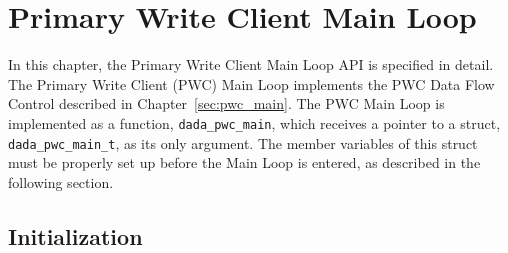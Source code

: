 \chapter{Primary Write Client Main Loop}
\label{app:dada_pwc_main}

In this chapter, the Primary Write Client Main Loop API is specified
in detail.  The Primary Write Client (PWC) Main Loop implements the
PWC Data Flow Control described in Chapter~\ref{sec:pwc_main}.  The
PWC Main Loop is implemented as a function, {\tt dada\_pwc\_main},
which receives a pointer to a struct, {\tt dada\_pwc\_main\_t}, as its
only argument.  The member variables of this struct must be properly
set up before the Main Loop is entered, as described in the following
section.

\section{Initialization}

